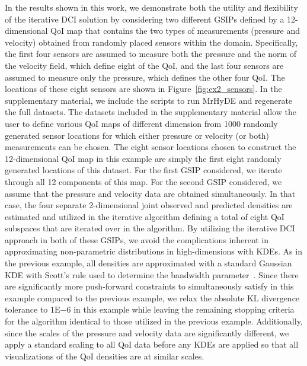 \documentclass{article}
\newcounter{example}[section]
\newcommand{\expnumber}[2]{{#1}\mathrm{E}{#2}}
\begin{document}
In the results shown in this work, we demonstrate both the utility and flexibility of the iterative DCI solution by considering two different GSIPs defined by a 12-dimensional QoI map that contains the two types of measurements (pressure and velocity) obtained from randomly placed sensors within the domain.
Specifically, the first four sensors are assumed to measure both the pressure and the norm of the velocity field, which define eight of the QoI, and the last four sensors are assumed to measure only the pressure, which defines the other four QoI.
The locations of these eight sensors are shown in Figure~\ref{fig:ex2_sensors}. 
In the supplementary material, we include the scripts to run MrHyDE and regenerate the full datasets.
The datasets included in the supplementary material allow the user to define various QoI maps of different dimension from 1000 randomly generated sensor locations for which either pressure or velocity (or both) measurements can be chosen.
The eight sensor locations chosen to construct the 12-dimensional QoI map in this example are simply the first eight randomly generated locations of this dataset. 
For the first GSIP considered, we iterate through all 12 components of this map.
For the second GSIP considered, we assume that the pressure and velocity data are obtained simultaneously.
In that case, the four separate 2-dimensional joint observed and predicted densities are estimated and utilized in the iterative algorithm defining a total of eight QoI subspaces that are iterated over in the algorithm. 
By utilizing the iterative DCI approach in both of these GSIPs, we avoid the complications inherent in approximating non-parametric distributions in high-dimensions with KDEs. 
As in the previous example, all densities are approximated with a standard Gaussian KDE with Scott's rule used to determine the bandwidth parameter~\cite{TS92}.
Since there are significantly more push-forward constraints to simultaneously satisfy in this example compared to the previous example, we relax the absolute KL divergence tolerance to $\expnumber{1}{-6}$ in this example while leaving the remaining stopping criteria for the algorithm identical to those utilized in the previous example.
Additionally, since the scales of the pressure and velocity data are significantly different, we apply a standard scaling to all QoI data before any KDEs are applied so that all visualizations of the QoI densities are at similar scales. 
\end{document}
